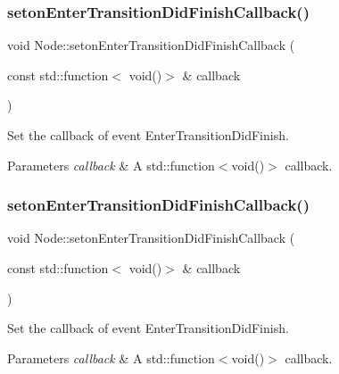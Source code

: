 \subsubsection{\texorpdfstring{seton\+Enter\+Transition\+Did\+Finish\+Callback()}{setonEnterTransitionDidFinishCallback()}\hspace{0.1cm}{\footnotesize\ttfamily [1/2]}}
{\footnotesize\ttfamily void Node\+::seton\+Enter\+Transition\+Did\+Finish\+Callback (\begin{DoxyParamCaption}\item[{const std\+::function$<$ void()$>$ \&}]{callback }\end{DoxyParamCaption})\hspace{0.3cm}{\ttfamily [inline]}}

Set the callback of event Enter\+Transition\+Did\+Finish. 
\begin{DoxyParams}{Parameters}
{\em callback} & A std\+::function$<$void()$>$ callback. \\
\hline
\end{DoxyParams}
\mbox{\label{classNode_aad666c48b3a6952c3c4b6c4c1eb446ad}} 
\subsubsection{\texorpdfstring{seton\+Enter\+Transition\+Did\+Finish\+Callback()}{setonEnterTransitionDidFinishCallback()}\hspace{0.1cm}{\footnotesize\ttfamily [2/2]}}
{\footnotesize\ttfamily void Node\+::seton\+Enter\+Transition\+Did\+Finish\+Callback (\begin{DoxyParamCaption}\item[{const std\+::function$<$ void()$>$ \&}]{callback }\end{DoxyParamCaption})\hspace{0.3cm}{\ttfamily [inline]}}

Set the callback of event Enter\+Transition\+Did\+Finish. 
\begin{DoxyParams}{Parameters}
{\em callback} & A std\+::function$<$void()$>$ callback. \\
\hline
\end{DoxyParams}
\mbox{\label{classNode_a82e2254c47969bfa81be037230738367}} 
